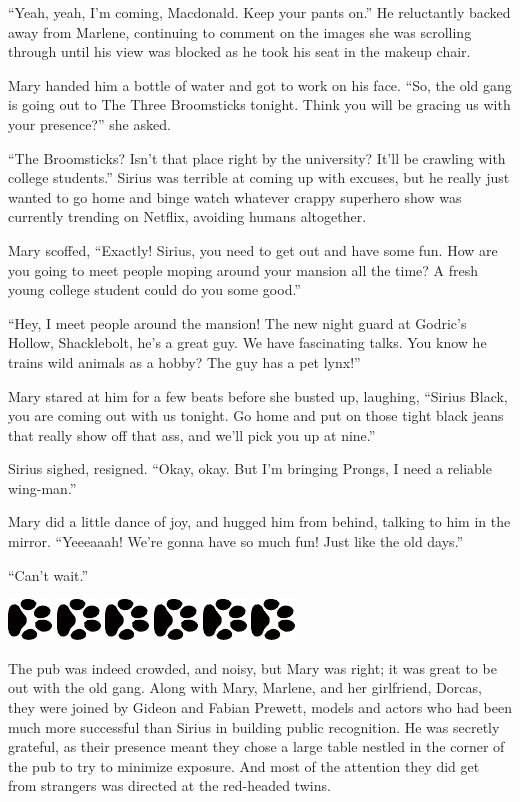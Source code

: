 \documentclass[12pt,twoside,openright]{memoir}
\newcommand{\dogPrintRule}{	
	\begin{center}
		\hspace{.5em}
		\includegraphics[angle=60]{dogprint.pdf}
		\hspace{.5em}
		\includegraphics[angle=120]{dogprint.pdf}
		\hspace{.5em}
		\includegraphics[angle=60]{dogprint.pdf}
		\hspace{.5em}
		\includegraphics[angle=120]{dogprint.pdf}
		\hspace{.5em}
		\includegraphics[angle=60]{dogprint.pdf}
		\hspace{.5em}
		\includegraphics[angle=120]{dogprint.pdf}
		\hspace{.5em}
	\end{center}
}
\begin{document}
``Yeah, yeah, I'm coming, Macdonald. Keep your pants on.'' He reluctantly backed away from Marlene, continuing to comment on the images she was scrolling through until his view was blocked as he took his seat in the makeup chair. 

Mary handed him a bottle of water and got to work on his face. ``So, the old gang is going out to The Three Broomsticks tonight. Think you will be gracing us with your presence?'' she asked.

``The Broomsticks? Isn't that place right by the university? It'll be crawling with college students.'' Sirius was terrible at coming up with excuses, but he really just wanted to go home and binge watch whatever crappy superhero show was currently trending on Netflix, avoiding humans altogether. 

Mary scoffed, ``Exactly! Sirius, you need to get out and have some fun. How are you going to meet people moping around your mansion all the time? A fresh young college student could do you some good.'' 

``Hey, I meet people around the mansion! The new night guard at Godric's Hollow, Shacklebolt, he's a great guy. We have fascinating talks. You know he trains wild animals as a hobby? The guy has a pet lynx!'' 

Mary stared at him for a few beats before she busted up, laughing, ``Sirius Black, you are coming out with us tonight. Go home and put on those tight black jeans that really show off that ass, and we'll pick you up at nine.'' 

Sirius sighed, resigned. ``Okay, okay. But I'm bringing Prongs, I need a reliable wing-man.'' 

Mary did a little dance of joy, and hugged him from behind, talking to him in the mirror. ``Yeeeaaah! We're gonna have so much fun! Just like the old days.'' 

``Can't wait.'' 

\dogPrintRule

The pub was indeed crowded, and noisy, but Mary was right; it was great to be out with the old gang. Along with Mary, Marlene, and her girlfriend, Dorcas, they were joined by Gideon and Fabian Prewett, models and actors who had been much more successful than Sirius in building public recognition. He was secretly grateful, as their presence meant they chose a large table nestled in the corner of the pub to try to minimize exposure. And most of the attention they did get from strangers was directed at the red-headed twins. 
\end{document}
